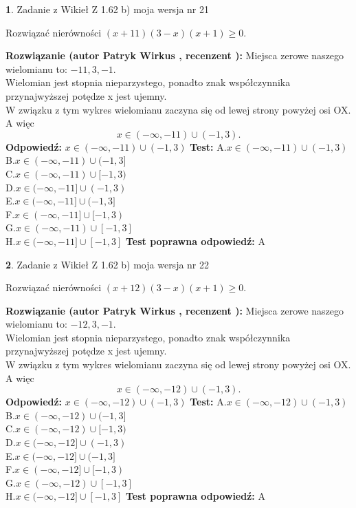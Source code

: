 \documentclass[12pt, a4paper]{article}
\theoremstyle{definition} %
\newtheorem{zad}{}
\newcommand{\zadStart}[1]{\begin{zad}#1\newline}
\newcommand{\zadStop}{\end{zad}}
\newcommand{\rozwStart}[2]{\noindent \textbf{Rozwiązanie (autor #1 , recenzent #2): }\newline}
\newcommand{\rozwStop}{\newline}
\newcommand{\odpStart}{\noindent \textbf{Odpowiedź:}\newline}
\newcommand{\odpStop}{\newline}
\newcommand{\testStart}{\noindent \textbf{Test:}\newline}
\newcommand{\testStop}{\newline}
\newcommand{\kluczStart}{\noindent \textbf{Test poprawna odpowiedź:}\newline}
\newcommand{\kluczStop}{\newline}
\begin{document}
\zadStart{Zadanie z Wikieł Z 1.62 b) moja wersja nr 21}

Rozwiązać nierówności $(x+11)(3-x)(x+1)\ge0$.
\zadStop
\rozwStart{Patryk Wirkus}{}
Miejsca zerowe naszego wielomianu to: $-11, 3, -1$.\\
Wielomian jest stopnia nieparzystego, ponadto znak współczynnika przy\linebreak najwyższej potędze x jest ujemny.\\ W związku z tym wykres wielomianu zaczyna się od lewej strony powyżej osi OX. A więc $$x \in (-\infty,-11) \cup (-1,3).$$
\rozwStop
\odpStart
$x \in (-\infty,-11) \cup (-1,3)$
\odpStop
\testStart
A.$x \in (-\infty,-11) \cup (-1,3)$\\
B.$x \in (-\infty,-11) \cup (-1,3]$\\
C.$x \in (-\infty,-11) \cup [-1,3)$\\
D.$x \in (-\infty,-11] \cup (-1,3)$\\
E.$x \in (-\infty,-11] \cup (-1,3]$\\
F.$x \in (-\infty,-11] \cup [-1,3)$\\
G.$x \in (-\infty,-11) \cup [-1,3]$\\
H.$x \in (-\infty,-11] \cup [-1,3]$
\testStop
\kluczStart
A
\kluczStop



\zadStart{Zadanie z Wikieł Z 1.62 b) moja wersja nr 22}

Rozwiązać nierówności $(x+12)(3-x)(x+1)\ge0$.
\zadStop
\rozwStart{Patryk Wirkus}{}
Miejsca zerowe naszego wielomianu to: $-12, 3, -1$.\\
Wielomian jest stopnia nieparzystego, ponadto znak współczynnika przy\linebreak najwyższej potędze x jest ujemny.\\ W związku z tym wykres wielomianu zaczyna się od lewej strony powyżej osi OX. A więc $$x \in (-\infty,-12) \cup (-1,3).$$
\rozwStop
\odpStart
$x \in (-\infty,-12) \cup (-1,3)$
\odpStop
\testStart
A.$x \in (-\infty,-12) \cup (-1,3)$\\
B.$x \in (-\infty,-12) \cup (-1,3]$\\
C.$x \in (-\infty,-12) \cup [-1,3)$\\
D.$x \in (-\infty,-12] \cup (-1,3)$\\
E.$x \in (-\infty,-12] \cup (-1,3]$\\
F.$x \in (-\infty,-12] \cup [-1,3)$\\
G.$x \in (-\infty,-12) \cup [-1,3]$\\
H.$x \in (-\infty,-12] \cup [-1,3]$
\testStop
\kluczStart
A
\kluczStop
\end{document}
